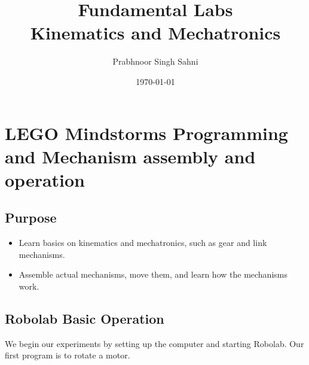 \documentclass[12pt,a4paper]{report}
\title{Fundamental Labs\\Kinematics and Mechatronics}
\author{Prabhnoor Singh Sahni}
\date{\today}
\begin{document}
\maketitle
\tableofcontents

\chapter{LEGO Mindstorms Programming and Mechanism assembly and operation}

\section{Purpose}
\begin{itemize}
    \item Learn basics on kinematics and mechatronics, such as gear and link mechanisms.
    \item Assemble actual mechanisms, move them, and learn how the mechanisms work.
\end{itemize}
\section{Robolab Basic Operation}
We begin our experiments by setting up the computer and starting Robolab. 
Our first program is to rotate a motor.
\end{document}
